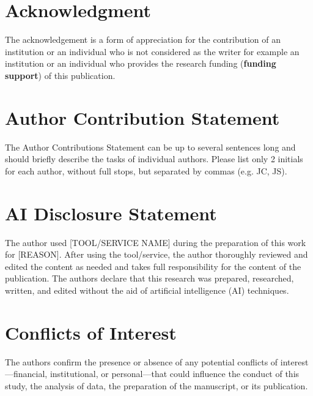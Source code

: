 \section{Acknowledgment}
The acknowledgement is a form of appreciation for the contribution of an institution or an individual who is not considered as the writer for example an institution or an individual who provides the research funding (\textbf{funding support}) of this publication.

\section{Author Contribution Statement}
The Author Contributions Statement can be up to several sentences long and should briefly describe the tasks of individual authors. Please list only 2 initials for each author, without full stops, but separated by commas (e.g. JC, JS). 

\section{AI Disclosure Statement}
The author used [TOOL/SERVICE NAME] during the preparation of this work for [REASON]. After using the tool/service, the author thoroughly reviewed and edited the content as needed and takes full responsibility for the content of the publication.
The authors declare that this research was prepared, researched, written, and edited without the aid of artificial intelligence (AI) techniques.

\section{Conflicts of Interest}
The authors confirm the presence or absence of any potential conflicts of interest—financial, institutional, or personal—that could influence the conduct of this study, the analysis of data, the preparation of the manuscript, or its publication.
